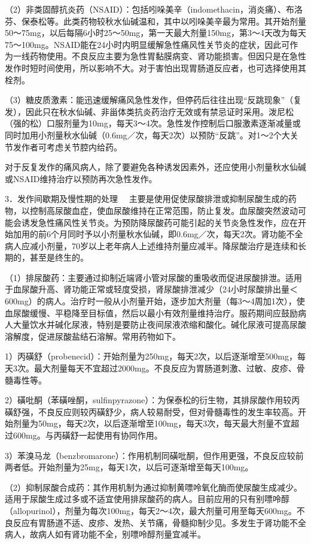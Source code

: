 （2）非类固醇抗炎药（NSAID）：包括吲哚美辛（indomethacin，消炎痛）、布洛芬、保泰松等。此类药物较秋水仙碱温和，其中以吲哚美辛最为常用。其开始剂量50～75mg，以后每隔6小时25～50mg，第一天最大剂量150mg，第3～4天改为每天75～100mg。NSAID能在24小时内明显缓解急性痛风性关节炎的症状，因此可作为一线药物使用。不良反应主要为急性胃黏膜病变、肾功能损害。但因只是在急性发作时短时间使用，所以影响不大。对于害怕出现胃肠道反应者，也可选择使用其栓剂。

（3）糖皮质激素：能迅速缓解痛风急性发作，但停药后往往出现“反跳现象”（复发），因此只在秋水仙碱、非甾体类抗炎药治疗无效或有禁忌证时采用。泼尼松（强的松）口服剂量为10mg，每天3～4次。急性发作控制后口服激素逐渐减量或同时加用小剂量秋水仙碱（0.6mg／次，每天2次）以预防“反跳”。对1～2个大关节发作者可考虑关节腔内给药。

对于反复发作的痛风病人，除了要避免各种诱发因素外，还应使用小剂量秋水仙碱或NSAID维持治疗以预防再次急性发作。

{3．发作间歇期及慢性期的处理}
　主要是使用促使尿酸排泄或抑制尿酸生成的药物，以控制高尿酸血症，使血尿酸维持在正常范围，防止复发。血尿酸突然波动可能会诱发急性痛风性关节炎。为预防降尿酸药可能引起的关节炎急性发作，应在开始加用的前6个月同时予以小剂量秋水仙碱，即0.6mg／次，每天2次。肾功能不全病人应减小剂量，70岁以上老年病人上述维持剂量应减半。降尿酸治疗是连续和长期的，甚至是终生的。

（1）排尿酸药：主要通过抑制近端肾小管对尿酸的重吸收而促进尿酸排泄。适用于血尿酸升高、肾功能正常或轻度受损，肾尿酸排泄减少（24小时尿酸排出量＜600mg）的病人。治疗时一般从小剂量开始，逐步加大剂量（每3～4周加1次），使血尿酸缓慢、平稳降至目标值，然后以最小有效剂量维持治疗。服药期间应鼓励病人大量饮水并碱化尿液，特别是要防止夜间尿液浓缩和酸化。碱化尿液可提高尿酸溶解度，促进尿酸盐结石溶解。常用药物如下。

1）丙磺舒（probenecid）：开始剂量为250mg，每天2次，以后逐渐增至500mg，每天3次。最大剂量每天不宜超过2000mg。不良反应为胃肠道刺激、过敏、皮疹、骨髓毒性等。

2）磺吡酮（苯磺唑酮，sulfinpyrazone）：为保泰松的衍生物，其排尿酸作用较丙磺舒强，不良反应则较丙磺舒少，病人较易耐受，但对骨髓毒性的发生率较高。开始剂量为50mg，每天2次，以后逐渐增至100mg，每天3次，每天最大剂量不宜超过600mg。与丙磺舒一起使用有协同作用。

3）苯溴马龙（benzbromarone）：作用机制同磺吡酮，但作用更强，不良反应较前两者低。开始剂量为25mg，每天1次，以后可逐渐增至每天100mg。

（2）抑制尿酸合成药：其作用机制为通过抑制黄嘌呤氧化酶而使尿酸生成减少。适用于尿酸生成过多或不适宜使用排尿酸药的病人。目前应用的只有别嘌呤醇（allopurinol），剂量为每次100mg，每天2～4次，最大剂量可用至每天600mg。不良反应有胃肠道不适、皮疹、发热、关节痛，骨髓抑制少见。多发生于肾功能不全病人，故病人如有肾功能不全，别嘌呤醇剂量宜减半。

